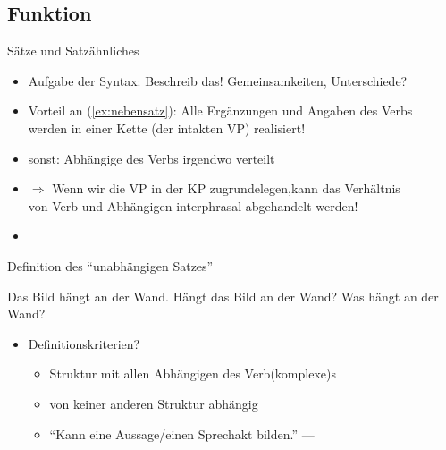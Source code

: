 \subsection{Funktion}

\begin{frame}
  {Sätze und Satzähnliches}
  \pause
  \begin{exe}
    \pause
    \pause
    \pause
  \end{exe}
  \pause
  \Halbzeile
  \begin{itemize}[<+->]
    \item Aufgabe der Syntax: \alert{Beschreib das!} Gemeinsamkeiten, Unterschiede?
    \item Vorteil an (\ref{ex:nebensatz}): \alert{Alle Ergänzungen und Angaben des Verbs\\
      werden in einer Kette (der intakten VP) realisiert!}
    \item sonst: Abhängige des Verbs irgendwo verteilt
    \item $\Rightarrow$ Wenn wir die VP in der KP zugrundelegen,kann das Verhältnis\\
      von Verb und Abhängigen interphrasal abgehandelt werden!
    \item {}
  \end{itemize}
\end{frame}

\begin{frame}
  {Definition des "`unabhängigen Satzes"'}
  \pause
  \begin{exe}
    \ex Das Bild hängt an der Wand.
    \pause
    \ex Hängt das Bild an der Wand?
    \pause
    \ex Was hängt an der Wand?
  \end{exe}
  \pause
  \begin{itemize}[<+->]
    \item Definitionskriterien?
      \begin{itemize}[<+->]
        \item Struktur mit \alert{allen Abhängigen} des Verb(komplexe)s
        \item \alert{von keiner anderen Struktur abhängig}
          \Halbzeile
        \item "`Kann eine Aussage\slash einen Sprechakt bilden."' \pause --- 
      \end{itemize}
  \end{itemize}
\end{frame}

